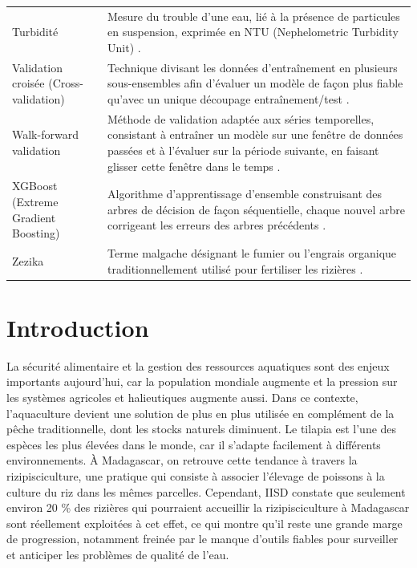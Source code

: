 \documentclass[a4paper,12pt, oneside]{article}
\begin{document}
\begin{longtable}{@{}p{4cm}p{13cm}@{}}
Turbidité & Mesure du trouble d'une eau, lié à la présence de particules en suspension, exprimée en NTU (Nephelometric Turbidity Unit) \cite{usgsturbidity}. \\[24pt]
Validation croisée (Cross-validation) & Technique divisant les données d'entraînement en plusieurs sous-ensembles afin d'évaluer un modèle de façon plus fiable qu'avec un unique découpage entraînement/test \cite{scikitlearn}. \\[36pt]
Walk-forward validation & Méthode de validation adaptée aux séries temporelles, consistant à entraîner un modèle sur une fenêtre de données passées et à l'évaluer sur la période suivante, en faisant glisser cette fenêtre dans le temps \cite{fpp3}. \\[36pt]
XGBoost (Extreme Gradient Boosting) & Algorithme d'apprentissage d'ensemble construisant des arbres de décision de façon séquentielle, chaque nouvel arbre corrigeant les erreurs des arbres précédents \cite{chenguestrin2016}. \\[24pt]
Zezika & Terme malgache désignant le fumier ou l'engrais organique traditionnellement utilisé pour fertiliser les rizières \cite{apdra2023}. \\[36pt]
\end{longtable}




\vspace*{\fill}
\newpage

\listoftables

\vspace*{\fill}
\newpage

\listoffigures

\vspace*{\fill}
\newpage
{}
\section{Introduction}

La sécurité alimentaire et la gestion des ressources aquatiques sont des enjeux importants aujourd'hui, car la population mondiale augmente et la pression sur les systèmes agricoles et halieutiques augmente aussi. Dans ce contexte, l'aquaculture devient une solution de plus en plus utilisée en complément de la pêche traditionnelle, dont les stocks naturels diminuent. Le tilapia est l'une des espèces les plus élevées dans le monde, car il s'adapte facilement à différents environnements. À Madagascar, on retrouve cette tendance à travers la rizipisciculture, une pratique qui consiste à associer l'élevage de poissons à la culture du riz dans les mêmes parcelles. Cependant, IISD constate que seulement environ 20 \% des rizières qui pourraient accueillir la rizipisciculture à Madagascar sont réellement exploitées à cet effet, ce qui montre qu'il reste une grande marge de progression, notamment freinée par le manque d'outils fiables pour surveiller et anticiper les problèmes de qualité de l'eau.\\
\end{document}
